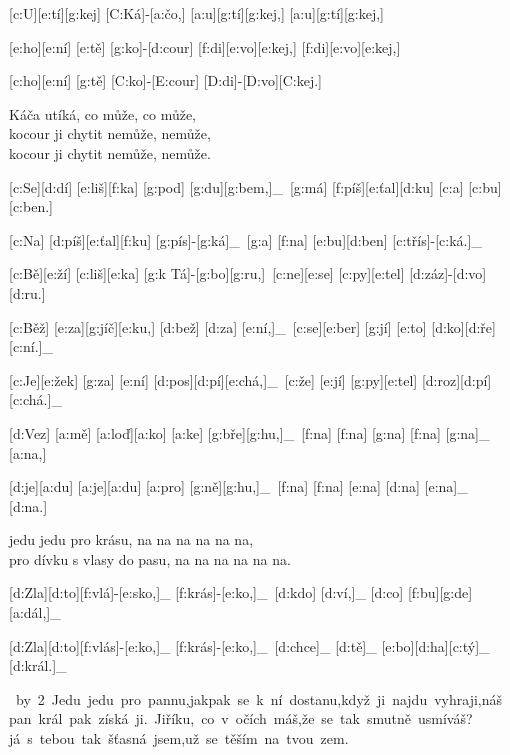 [c:U][e:tí][g:kej] [C:Ká]-[a:čo,] [a:u][g:tí][g:kej,] [a:u][g:tí][g:kej,]\

[e:ho][e:ní] [e:tě] [g:ko]-[d:cour] [f:di][e:vo][e:kej,] [f:di][e:vo][e:kej,]\

[c:ho][e:ní] [g:tě] [C:ko]-[E:cour] [D:di]-[D:vo][C:kej.]\

Káča utíká, co může, co může,\\
kocour ji chytit nemůže, nemůže,\\
kocour ji chytit nemůže, nemůže.



[c:Se][d:dí] [e:liš][f:ka] [g:pod] [g:du][g:bem,]_\
[g:má] [f:píš][e:ťal][d:ku] [c:a] [c:bu][c:ben.]\

[c:Na] [d:píš][e:ťal][f:ku] [g:pís]-[g:ká]_\
[g:a] [f:na] [e:bu][d:ben] [c:třís]-[c:ká.]_\



[c:Bě][e:ží] [c:liš][e:ka] [g:k Tá]-[g:bo][g:ru,]\
[c:ne][e:se] [c:py][e:tel] [d:záz]-[d:vo][d:ru.]\

[c:Běž] [e:za][g:jíč][e:ku,] [d:bež] [d:za] [e:ní,]_\
[c:se][e:ber] [g:jí] [e:to] [d:ko][d:ře][c:ní.]_\

[c:Je][e:žek] [g:za] [e:ní] [d:pos][d:pí][e:chá,]_\
[c:že] [e:jí] [g:py][e:tel] [d:roz][d:pí][c:chá.]_\



[d:Vez] [a:mě] [a:loď][a:ko] [a:ke] [g:bře][g:hu,]_\
[f:na] [f:na] [g:na] [f:na] [g:na]_ [a:na,]\

[d:je][a:du] [a:je][a:du] [a:pro] [g:ně][g:hu,]_\
[f:na] [f:na] [e:na] [d:na] [e:na]_ [d:na.]\

jedu jedu pro krásu, na na na na na na,\\
pro dívku s vlasy do pasu, na na na na na na.

[d:Zla][d:to][f:vlá]-[e:sko,]_ [f:krás]-[e:ko,]_\
[d:kdo] [d:ví,]_ [d:co] [f:bu][g:de] [a:dál,]_\

[d:Zla][d:to][f:vlás]-[e:ko,]_ [f:krás]-[e:ko,]_\
[d:chce]_ [d:tě]_ [e:bo][d:ha][c:tý]_ [d:král.]_\

\leavevmode
\hbox{%
\divide\hsize by 2
\vbox{Jedu jedu pro pannu,\\
jakpak se k ní dostanu,\\
když ji najdu vyhraji,\\
náš pan král pak získá ji.}%
\vbox{Jiříku, co v očích máš,\\
že se tak smutně usmíváš?\\
já s tebou tak šťasná jsem,\\
už se těším na tvou zem.}}


